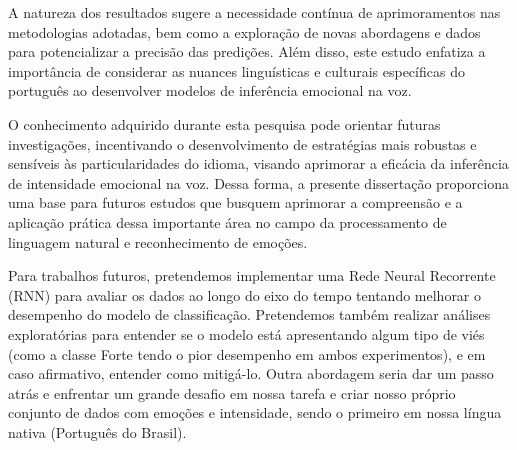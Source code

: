 A natureza dos resultados sugere a necessidade contínua de aprimoramentos nas metodologias adotadas, bem como a exploração de novas abordagens e dados para potencializar a precisão das predições. Além disso, este estudo enfatiza a importância de considerar as nuances linguísticas e culturais específicas do português ao desenvolver modelos de inferência emocional na voz.

O conhecimento adquirido durante esta pesquisa pode orientar futuras investigações, incentivando o desenvolvimento de estratégias mais robustas e sensíveis às particularidades do idioma, visando aprimorar a eficácia da inferência de intensidade emocional na voz. Dessa forma, a presente dissertação proporciona uma base para futuros estudos que busquem aprimorar a compreensão e a aplicação prática dessa importante área no campo da processamento de linguagem natural e reconhecimento de emoções.

Para trabalhos futuros, pretendemos implementar uma Rede Neural Recorrente (\acrshort{RNN}) para avaliar os dados ao longo do eixo do tempo tentando melhorar o desempenho do modelo de classificação. Pretendemos também realizar análises exploratórias para entender se o modelo está apresentando algum tipo de viés (como a classe Forte tendo o pior desempenho em ambos experimentos), e em caso afirmativo, entender como mitigá-lo. Outra abordagem seria dar um passo atrás e enfrentar um grande desafio em nossa tarefa e criar nosso próprio conjunto de dados com emoções e intensidade, sendo o primeiro em nossa língua nativa (Português do Brasil).
